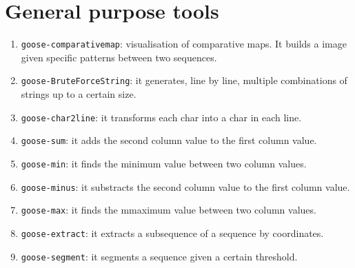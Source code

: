 \chapter{General purpose tools}
\label{seq}

\begin{enumerate}
\item \texttt{goose-comparativemap}: visualisation of comparative maps. It builds a image given specific patterns between two sequences.
\item \texttt{goose-BruteForceString}: it generates, line by line, multiple combinations of strings up to a certain size.
\item \texttt{goose-char2line}: it transforms each char into a char in each line.
\item \texttt{goose-sum}: it adds the second column value to the first column value.
\item \texttt{goose-min}: it finds the minimum value between two column values.
\item \texttt{goose-minus}: it substracts the second column value to the first column value.
\item \texttt{goose-max}: it finds the mmaximum value between two column values.
\item \texttt{goose-extract}: it extracts a subsequence of a sequence by coordinates.
\item \texttt{goose-segment}: it segments a sequence given a certain threshold.
\end{enumerate}

%
%
%
%
%
%
%
%
%